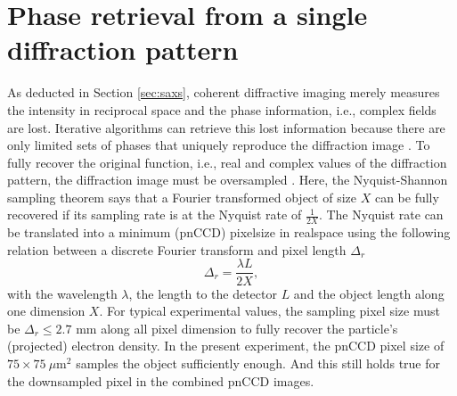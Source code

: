 \section{Phase retrieval from a single diffraction pattern}\label{sec:phase-retrieval}
As deducted in Section \ref{sec:saxs}, coherent diffractive imaging merely measures the intensity in reciprocal space and the phase information, i.e., complex fields are lost. Iterative algorithms can retrieve this lost information because there are only limited sets of phases that uniquely reproduce the diffraction image \citep{Bruck-1979-OpticsCom,Bates-1981-Optik}. To fully recover the original function, i.e., real and complex values of the diffraction pattern, the diffraction image must be oversampled \citep{Sayre-1952-ActCryst}. Here, the Nyquist-Shannon sampling theorem says that a Fourier transformed object of size $X$ can be fully recovered if its sampling rate is at the Nyquist rate of $\frac{1}{2X}$\index{}. The Nyquist rate can be translated into a minimum (pnCCD) pixelsize in realspace using the following relation between a discrete Fourier transform and pixel length $\Delta_{r}$ \citep{Williams-2010-NJP}
\begin{equation}
\Delta_{r} = \frac{\lambda L}{2 X},
\label{eq:disc-fourier-relation-pixelsize}
\end{equation}
with the wavelength $\lambda$, the length to the detector $L$ and the object length along one dimension $X$. For typical experimental values, the sampling pixel size must be $\Delta_{r} \leq 2.7$ mm along all pixel dimension to fully recover the particle's (projected) electron density. In the present experiment, the pnCCD pixel size of $75 \times 75~\mu\text{m}^{2}$ samples the object sufficiently enough. And this still holds true for the downsampled pixel in the combined pnCCD images.
%
%
%

